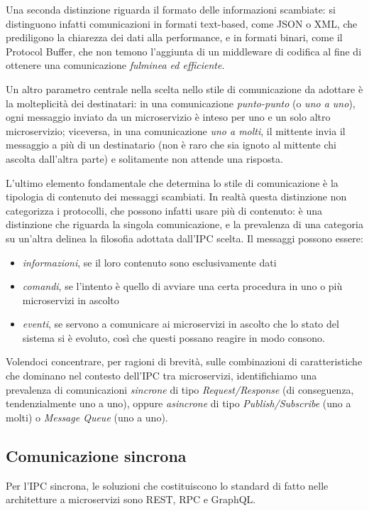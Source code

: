 Una seconda distinzione riguarda il formato delle informazioni scambiate: si distinguono infatti comunicazioni in formati text-based, come JSON o XML, che prediligono la chiarezza dei dati alla performance, e in formati binari, come il Protocol Buffer, che non temono l'aggiunta di un middleware di codifica al fine di ottenere una comunicazione \emph{fulminea ed efficiente}.

Un altro parametro centrale nella scelta nello stile di comunicazione da adottare è la molteplicità dei destinatari: in una comunicazione \emph{punto-punto} (o \emph{uno a uno}), ogni messaggio inviato da un microservizio è inteso per uno e un solo altro microservizio; viceversa, in una comunicazione \emph{uno a molti}, il mittente invia il messaggio a più di un destinatario (non è raro che sia ignoto al mittente chi ascolta dall'altra parte) e solitamente non attende una risposta.

L'ultimo elemento fondamentale che determina lo stile di comunicazione è la tipologia di contenuto dei messaggi scambiati. In realtà questa distinzione non categorizza i protocolli, che possono infatti usare più di contenuto: è una distinzione che riguarda la singola comunicazione, e la prevalenza di una categoria su un'altra delinea la filosofia adottata dall'IPC scelta.
Il messaggi possono essere:

\begin{itemize}
	\item \emph{informazioni}, se il loro contenuto sono esclusivamente dati
	\item \emph{comandi}, se l'intento è quello di avviare una certa procedura in uno o più microservizi in ascolto
	\item \emph{eventi}, se servono a comunicare ai microservizi in ascolto che lo stato del sistema si è evoluto, così che questi possano reagire in modo consono.
\end{itemize}


Volendoci concentrare, per ragioni di brevità, sulle combinazioni di caratteristiche che dominano nel contesto dell'IPC tra microservizi, identifichiamo una prevalenza di comunicazioni \emph{sincrone} di tipo \emph{Request/Response} (di conseguenza, tendenzialmente uno a uno), oppure \emph{asincrone} di tipo \emph{Publish/Subscribe} (uno a molti) o \emph{Message Queue} (uno a uno).

\subsection{Comunicazione sincrona}
Per l'IPC sincrona, le soluzioni che costituiscono lo standard di fatto nelle architetture a microservizi sono REST, RPC e GraphQL.

